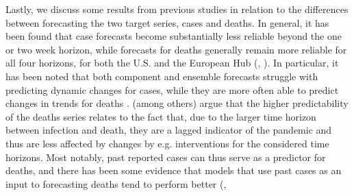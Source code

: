 Lastly, we discuss some results from previous studies in relation to the differences between forecasting the two target series, cases and deaths. In general, it has been found that case forecasts become substantially less reliable beyond the one or two week horizon, while forecasts for deaths generally remain more reliable for all four horizons, for both the U.S. and the European Hub (\cite{reich_predictability_2021}, \cite{sherratt_european_2022}). In particular, it has been noted that both component and ensemble forecasts struggle with predicting dynamic changes for cases, while they are more often able to predict changes in trends for deaths \citep{reich_predictability_2021}. \cite{bracher_pre-registered_2021} (among others) argue that the higher predictability of the deaths series relates to the fact that, due to the larger time horizon between infection and death, they are a lagged indicator of the pandemic and thus are less affected by changes by e.g. interventions for the considered time horizons. Most notably, past reported cases can thus serve as a predictor for deaths, and there has been some evidence that models that use past cases as an input to forecasting deaths tend to perform better (\cite{cramer_evaluation_2022}, \cite{bosse_comparing_2021).}\\
